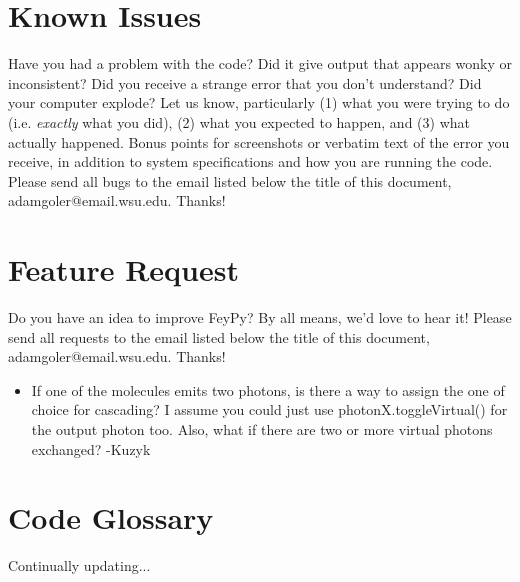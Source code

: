 \documentclass[11pt,a4paper,notitlepage]{article}
\begin{document}
\pagebreak

\section{Known Issues}

Have you had a problem with the code? Did it give output that appears wonky or inconsistent? Did you receive a strange error that you don't understand? Did your computer explode? Let us know, particularly (1) what you were trying to do (i.e. \textit{exactly} what you did), (2) what you expected to happen, and (3) what actually happened. Bonus points for screenshots or verbatim text of the error you receive, in addition to system specifications and how you are running the code. Please send all bugs to the email listed below the title of this document, adamgoler@email.wsu.edu. Thanks!

\section{Feature Request}

Do you have an idea to improve FeyPy? By all means, we'd love to hear it! Please send all requests to the email listed below the title of this document, adamgoler@email.wsu.edu. Thanks!

\begin{itemize}
	\item If one of the molecules emits two photons, is there a way to assign the one of choice for cascading?  I assume you could just use photonX.toggleVirtual() for the output photon too.  Also, what if there are two or more virtual photons exchanged? -Kuzyk
	
\end{itemize}

\section{Code Glossary}

Continually updating...
\end{document}
